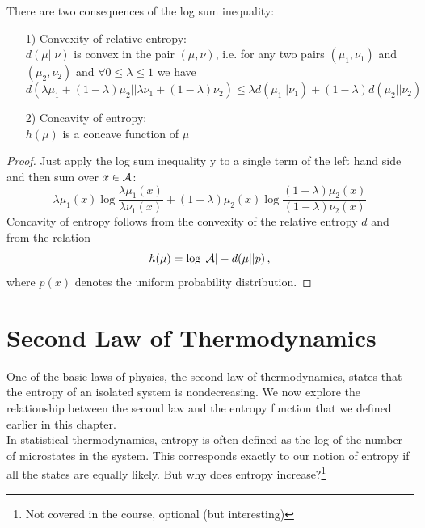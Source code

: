 There are two consequences of the log sum inequality:
\begin{theorem}
\hfill
    \begin{itemize}
        \item[1)] Convexity of relative entropy:
        \\$d(\mu || \nu)$ is convex in the pair $(\mu, \nu)$, i.e. for any two pairs $(\mu_1, \nu_1)$ and $(\mu_2, \nu_2)$  and $\forall 0 \leq \lambda \leq 1$ we have 
        \begin{equation*}
            d(\lambda \mu_1 + (1 - \lambda) \mu_2 || \lambda \nu_1 + (1 - \lambda) \nu_2 ) \leq \lambda d (\mu_1 || \nu_1) + (1 - \lambda) d (\mu_2 || \nu_2)
        \end{equation*}
        \item[2)] Concavity of entropy:
        \\$h(\mu)$ is a concave function of $\mu$
    \end{itemize}
\end{theorem}
\begin{proof}
    \hfill
    Just apply the log sum inequality y to a single term of the left hand side and then sum over $x \in \mathcal{A}$:
    \begin{equation*}
        \lambda \mu_1(x) \log \frac{\lambda \mu_1 (x)}{\lambda \nu_1 (x)} + (1 - \lambda) \mu_2(x) \log \frac{(1 - \lambda) \mu_2(x)}{(1 - \lambda) \nu_2(x)}
    \end{equation*}
    Concavity of entropy  follows from the convexity of the relative entropy $d$ and from the relation
    \begin{equation*}
        h(\mu) = \log |\mathcal{A}| - d (\mu || p) \, ,
    \end{equation*}
    where $p(x)$ denotes the uniform probability distribution.
\end{proof}

\section{Second Law of Thermodynamics}
\cite{Cover_and_Thomas} One of the basic laws of physics, the second law of thermodynamics, 
states that the entropy of an isolated system is nondecreasing. We now
explore the relationship between the second law and the entropy function
that we defined earlier in this chapter.
\\In statistical thermodynamics, entropy is often defined as the log of
the number of microstates in the system. This corresponds exactly to our
notion of entropy if all the states are equally likely. But why does entropy
increase?\footnote{Not covered in the course, optional (but interesting)}

